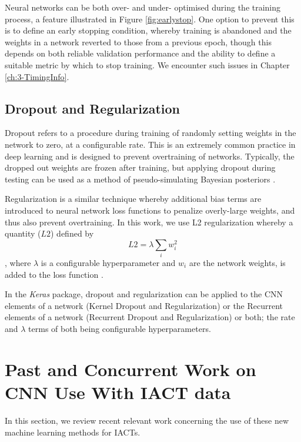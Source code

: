 Neural networks can be both over- and under- optimised during the training process, a feature illustrated in Figure \ref{fig:earlystop}. One option to prevent this is to define an early stopping condition, whereby training is abandoned and the weights in a network reverted to those from a previous epoch, though this depends on both reliable validation performance and the ability to define a suitable metric by which to stop training. We encounter such issues in Chapter \ref{ch:3-TimingInfo}.


\subsection{Dropout and Regularization}
Dropout refers to a procedure during training of randomly setting weights in the network to zero, at a configurable rate. This is an extremely common practice in deep learning and is designed to prevent overtraining of networks. Typically, the dropped out weights are frozen after training, but applying dropout during testing can be used as a method of pseudo-simulating Bayesian posteriors \cite{mike}\cite{gal2015}. 

Regularization is a similar technique whereby additional bias terms are introduced to neural network loss functions to penalize overly-large weights, and thus also prevent overtraining. In this work, we use L2 regularization whereby a quantity ($L2$) defined by
\begin{equation}
    L2=\lambda\sum_{i}w_i^2
\end{equation}
, where $\lambda$ is a configurable hyperparameter and $w_i$ are the network weights, is added to the loss function \cite{Keras}.

In the \textit{Keras} \cite{Keras} package, dropout and regularization can be applied to the CNN elements of a network (Kernel Dropout and Regularization) or the Recurrent elements of a network (Recurrent Dropout and Regularization) or both; the rate and $\lambda$ terms of both being configurable hyperparameters.

\section{Past and Concurrent Work on CNN Use With IACT data}
In this section, we review recent relevant work concerning the use of these new machine learning methods for IACTs.

